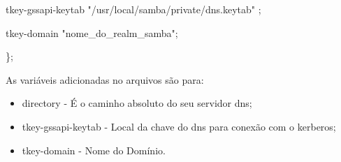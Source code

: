 tkey-gssapi-keytab "/usr/local/samba/private/dns.keytab" ;

tkey-domain "nome\_do\_realm\_samba";
	
\};

As variáveis adicionadas no arquivos são para:

\begin{itemize}
	\item{directory} -  É o caminho absoluto do seu servidor dns;
	\item{tkey-gssapi-keytab} - Local da chave do dns para conexão com o kerberos;
	\item{tkey-domain} - Nome do Domínio.
\end{itemize}

%       			
%
%
%					

